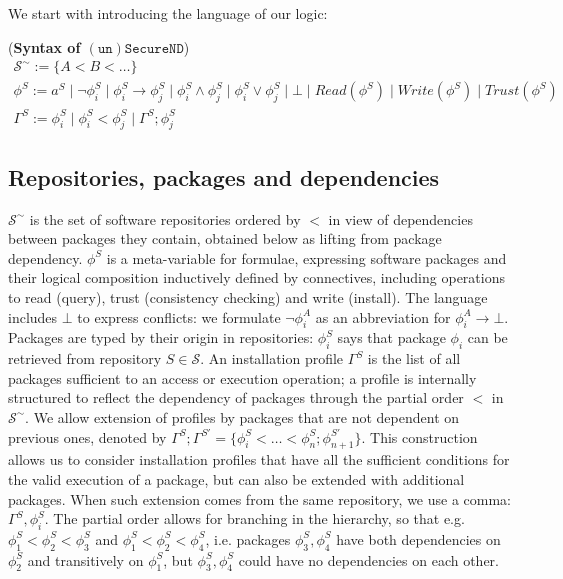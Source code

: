 \documentclass[]{llncs}
\begin{document}
We start with introducing the language of our logic:

\begin{definition}(\textbf{Syntax of $\mathtt{(un)SecureND}$})\label{def:syntax}
	\begin{displaymath}
	\begin{array}{l}
	\mathcal{S}^{\sim}:= \{A< B< \dots\}\\
	\phi^{S}:= a^{S}\mid \neg \phi^{S}_{i}\mid \phi^{S}_{i}\rightarrow \phi^{S}_{j}\mid \phi^{S}_{i}\wedge \phi^{S}_{j}\mid \phi^{S}_{i}\vee \phi^{S}_{j} \mid \bot \mid Read(\phi^{S})\mid Write(\phi^{S})\mid Trust(\phi^{S})\\
	\Gamma^{S}:= \phi^{S}_{i} \mid \phi^{S}_{i} < \phi^{S}_{j} \mid \Gamma^{S}; \phi^{S}_{j}

	\end{array}
	\end{displaymath}
\end{definition}
%

\subsection{Repositories, packages and dependencies}

$\mathcal{S}^{\sim}$ is the set of software repositories ordered by $<$ in view of dependencies between packages they contain, obtained below as lifting from package dependency. $\phi^{S}$ is a meta-variable for formulae, expressing software packages and their logical composition inductively defined by connectives, including operations to read (query), trust (consistency checking) and write (install). The language includes $\bot$ to express conflicts: we formulate $\neg \phi_{i}^{A}$ as an abbreviation for $\phi_{i}^{A} \rightarrow \bot$. Packages are typed by their origin in repositories: $\phi^{S}_{i}$ says that package $\phi_{i}$ can be retrieved from repository $S \in \mathcal{S}$. An installation profile $\Gamma^{S}$ is the list of all packages sufficient to an access or execution operation; a profile is internally structured to reflect the dependency of packages through the partial order $<$ in $\mathcal{S}^{\sim}$. We allow extension of profiles by packages that are not dependent on previous ones, denoted by $\Gamma^{S};\Gamma^{S'}= \{ \phi^{S}_{i}< \dots < \phi^{S}_{n};\phi^{S'}_{n+1}\}$. This construction allows us to consider installation profiles that have all the sufficient conditions for the valid execution of a package, but can also be extended with additional packages. When such extension comes from the same repository, we use a comma:  $\Gamma^{S}, \phi^{S}_{i}$. The partial order allows for branching in the hierarchy, so that e.g. $\phi_{1}^{S}<\phi_{2}^{S}<\phi_{3}^{S}$ and $\phi_{1}^{S}<\phi_{2}^{S}<\phi_{4}^{S}$,  i.e. packages $\phi_{3}^{S},\phi_{4}^{S}$ have both dependencies on $\phi_{2}^{S}$ and transitively on $\phi_{1}^{S}$, but $\phi_{3}^{S},\phi_{4}^{S}$ could have no dependencies on each other.
\end{document}
